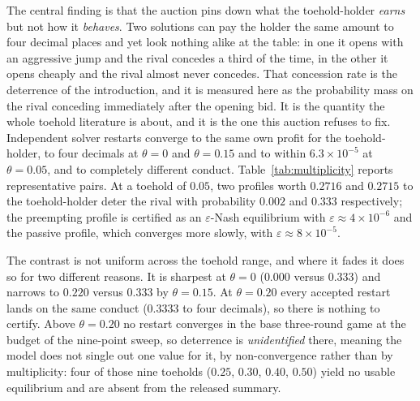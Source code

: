 \documentclass[11pt,a4paper]{article}
\newcommand{\theold}{\theta}   %
\begin{document}
The central finding is that the auction pins down what the toehold-holder \emph{earns} but not how it \emph{behaves}. Two solutions can pay the holder the same amount to four decimal places and yet look nothing alike at the table: in one it opens with an aggressive jump and the rival concedes a third of the time, in the other it opens cheaply and the rival almost never concedes. That concession rate is the deterrence of the introduction, and it is measured here as the probability mass on the rival conceding immediately after the opening bid. It is the quantity the whole toehold literature is about, and it is the one this auction refuses to fix. Independent solver restarts converge to the same own profit for the toehold-holder, to four decimals at $\theold=0$ and $\theold=0.15$ and to within $6.3\times10^{-5}$ at $\theold=0.05$, and to completely different conduct. Table~\ref{tab:multiplicity} reports representative pairs. At a toehold of $0.05$, two profiles worth $0.2716$ and $0.2715$ to the toehold-holder deter the rival with probability $0.002$ and $0.333$ respectively; the preempting profile is certified as an $\varepsilon$-Nash equilibrium with $\varepsilon\approx 4\times10^{-6}$ and the passive profile, which converges more slowly, with $\varepsilon\approx 8\times10^{-5}$.

The contrast is not uniform across the toehold range, and where it fades it does so for two different reasons. It is sharpest at $\theold=0$ ($0.000$ versus $0.333$) and narrows to $0.220$ versus $0.333$ by $\theold=0.15$. At $\theold=0.20$ every accepted restart lands on the same conduct ($0.3333$ to four decimals), so there is nothing to certify. Above $\theold=0.20$ no restart converges in the base three-round game at the budget of the nine-point sweep, so deterrence is \emph{unidentified} there, meaning the model does not single out one value for it, by non-convergence rather than by multiplicity: four of those nine toeholds ($0.25$, $0.30$, $0.40$, $0.50$) yield no usable equilibrium and are absent from the released summary.
\end{document}
